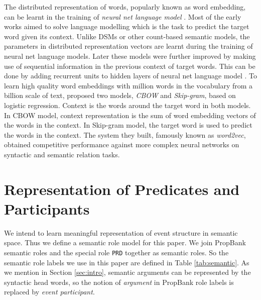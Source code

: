 \documentclass[a4paper]{article}
\begin{document}
The distributed representation of words, popularly known as word embedding, can be learnt in the training of \textit{neural net language model} \citep{bengio2003neural}. Most of the early works aimed to solve language modelling which is the task to predict the target word given its context. Unlike DSMs or other count-based semantic models, the parameters in distributed representation vectors are learnt during the training of neural net language models. Later these models were further improved by making use of sequential information in the previous context of target words. This can be done by adding recurrent units to hidden layers of neural net language model \citep{mikolov2010recurrent}. To learn high quality word embeddings with million words in the vocabulary from a billion scale of text, \citet{mikolov2013efficient} proposed two models, \textit{CBOW} and \textit{Skip-gram}, based on logistic regression. Context is the words around the target word in both models. In CBOW model, context representation is the sum of word embedding vectors of the words in the context. In Skip-gram model, the target word is used to predict the words in the context. The system they built, famously known as \textit{word2vec}, obtained competitive performance against more complex neural networks on syntactic and semantic relation tasks. 



 
\section{Representation of Predicates and Participants}
We intend to learn meaningful representation of event structure in semantic space. Thus we define a semantic role model for this paper. We join PropBank semantic roles and the special role \texttt{PRD} together as semantic roles. So the semantic role labels we use in this paper are defined in Table \ref{tab:semantic}. As we mention in Section \ref{sec:intro}, semantic arguments can be represented by the syntactic head words, so the notion of \textit{argument} in PropBank role labels is replaced by \textit{event participant}. 
% 
% 
\end{document}
